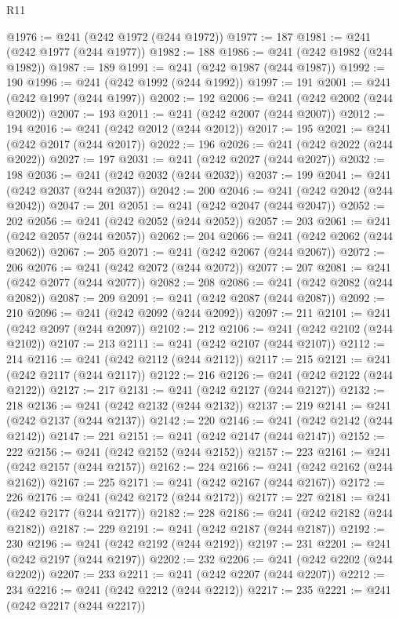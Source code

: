 \begin{lexlean}{R11}
\begin{coremodule}
{{{{{{{{{{{{{{{{{{{{{{{{{{{{{{{{{{{{{{{{{{{{{{{{{{{{{{{{{{{{{{{{{{{{{{{{{{{{{{{{{{{{{{{{{{{{{{{{{{{{{{{{{{@1976 := @241 (@242 @1972 (@244 @1972))
@1977 := 187
@1981 := @241 (@242 @1977 (@244 @1977))
@1982 := 188
@1986 := @241 (@242 @1982 (@244 @1982))
@1987 := 189
@1991 := @241 (@242 @1987 (@244 @1987))
@1992 := 190
@1996 := @241 (@242 @1992 (@244 @1992))
@1997 := 191
@2001 := @241 (@242 @1997 (@244 @1997))
@2002 := 192
@2006 := @241 (@242 @2002 (@244 @2002))
@2007 := 193
@2011 := @241 (@242 @2007 (@244 @2007))
@2012 := 194
@2016 := @241 (@242 @2012 (@244 @2012))
@2017 := 195
@2021 := @241 (@242 @2017 (@244 @2017))
@2022 := 196
@2026 := @241 (@242 @2022 (@244 @2022))
@2027 := 197
@2031 := @241 (@242 @2027 (@244 @2027))
@2032 := 198
@2036 := @241 (@242 @2032 (@244 @2032))
@2037 := 199
@2041 := @241 (@242 @2037 (@244 @2037))
@2042 := 200
@2046 := @241 (@242 @2042 (@244 @2042))
@2047 := 201
@2051 := @241 (@242 @2047 (@244 @2047))
@2052 := 202
@2056 := @241 (@242 @2052 (@244 @2052))
@2057 := 203
@2061 := @241 (@242 @2057 (@244 @2057))
@2062 := 204
@2066 := @241 (@242 @2062 (@244 @2062))
@2067 := 205
@2071 := @241 (@242 @2067 (@244 @2067))
@2072 := 206
@2076 := @241 (@242 @2072 (@244 @2072))
@2077 := 207
@2081 := @241 (@242 @2077 (@244 @2077))
@2082 := 208
@2086 := @241 (@242 @2082 (@244 @2082))
@2087 := 209
@2091 := @241 (@242 @2087 (@244 @2087))
@2092 := 210
@2096 := @241 (@242 @2092 (@244 @2092))
@2097 := 211
@2101 := @241 (@242 @2097 (@244 @2097))
@2102 := 212
@2106 := @241 (@242 @2102 (@244 @2102))
@2107 := 213
@2111 := @241 (@242 @2107 (@244 @2107))
@2112 := 214
@2116 := @241 (@242 @2112 (@244 @2112))
@2117 := 215
@2121 := @241 (@242 @2117 (@244 @2117))
@2122 := 216
@2126 := @241 (@242 @2122 (@244 @2122))
@2127 := 217
@2131 := @241 (@242 @2127 (@244 @2127))
@2132 := 218
@2136 := @241 (@242 @2132 (@244 @2132))
@2137 := 219
@2141 := @241 (@242 @2137 (@244 @2137))
@2142 := 220
@2146 := @241 (@242 @2142 (@244 @2142))
@2147 := 221
@2151 := @241 (@242 @2147 (@244 @2147))
@2152 := 222
@2156 := @241 (@242 @2152 (@244 @2152))
@2157 := 223
@2161 := @241 (@242 @2157 (@244 @2157))
@2162 := 224
@2166 := @241 (@242 @2162 (@244 @2162))
@2167 := 225
@2171 := @241 (@242 @2167 (@244 @2167))
@2172 := 226
@2176 := @241 (@242 @2172 (@244 @2172))
@2177 := 227
@2181 := @241 (@242 @2177 (@244 @2177))
@2182 := 228
@2186 := @241 (@242 @2182 (@244 @2182))
@2187 := 229
@2191 := @241 (@242 @2187 (@244 @2187))
@2192 := 230
@2196 := @241 (@242 @2192 (@244 @2192))
@2197 := 231
@2201 := @241 (@242 @2197 (@244 @2197))
@2202 := 232
@2206 := @241 (@242 @2202 (@244 @2202))
@2207 := 233
@2211 := @241 (@242 @2207 (@244 @2207))
@2212 := 234
@2216 := @241 (@242 @2212 (@244 @2212))
@2217 := 235
@2221 := @241 (@242 @2217 (@244 @2217))
}}}}}}}}}}}}}}}}}}}}}}}}}}}}}}}}}}}}}}}}}}}}}}}}}}}}}}}}}}}}}}}}}}}}}}}}}}}}}}}}}}}}}}}}}}}}}}}}}}}}}}}}}}
\end{coremodule}
\end{lexlean}
